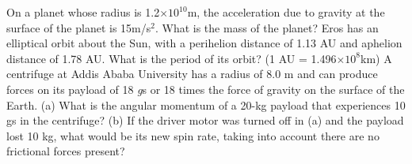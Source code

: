 \documentclass[9pt,addpoints]{exam}
\begin{document}
\begin{questions}
		\question On a planet whose radius is  1.2$\times10^{10}$m, the acceleration due to gravity at the surface of the planet is  15m/s$^2$. What is the mass of the planet?
		\question Eros has an elliptical orbit about the Sun, with a perihelion distance of 1.13 AU and aphelion distance of 1.78 AU. What is the period of its orbit? (1 AU = 1.496$\times10^8$km)
		\question A centrifuge at Addis Ababa University has a radius of 8.0 m and can produce forces on its payload of 18 \textit{g}s or 18 times the force of gravity on  the surface of the Earth. (a) What is the angular momentum of a 20-kg payload that experiences 10 gs in the centrifuge? (b) If the driver motor was turned off in (a) and the payload lost 10 kg, what would be its new spin rate, taking into account there are no frictional forces present?
		
	\end{questions}		
\end{document}
